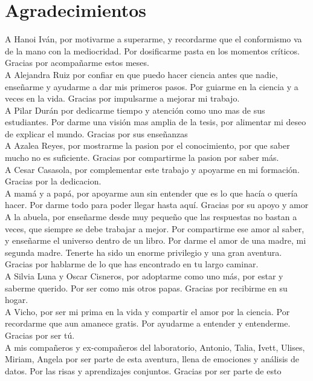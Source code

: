 \documentclass[12pt,letterpaper,final]{article}
\renewenvironment{acknowledgements}
{\newpage\section*{Agradecimientos}\begin{singlespace}\normalsize}
	{\end{singlespace}\par\newpage}
\begin{document}
\begin{acknowledgements}
A Hanoi Iván, por motivarme a superarme, y recordarme que el conformismo va de la mano con la mediocridad. Por dosificarme pasta en los momentos críticos. Gracias por acompañarme estos meses.\\

A Alejandra Ruiz por confiar en que puedo hacer ciencia antes que nadie, enseñarme y ayudarme a dar mis primeros pasos. Por guiarme en la ciencia y a veces en la vida. Gracias por impulsarme a mejorar mi trabajo.\\

A Pilar Durán por dedicarme tiempo y atención como uno mas de sus estudiantes. Por darme una visión mas amplia de la tesis, por alimentar mi deseo de explicar el mundo. Gracias por sus enseñanzas\\

A Azalea Reyes, por mostrarme la pasion por el conocimiento, por que saber mucho no es suficiente. Gracias por compartirme la pasion por saber más. \\

A Cesar Casasola, por complementar este trabajo y apoyarme en mi formación. Gracias por la dedicacion.\\

A mamá y a papá, por apoyarme aun sin entender que es lo que hacía o quería hacer. Por darme todo para poder llegar hasta aquí. Gracias por su apoyo y amor\\

A la abuela, por enseñarme desde muy pequeño que las respuestas no bastan a veces, que siempre se debe trabajar a mejor. Por compartirme ese amor al saber, y enseñarme el universo dentro de un libro. Por darme el amor de una madre, mi segunda madre. Tenerte ha sido un enorme privilegio y una gran aventura.  Gracias por hablarme de lo que has encontrado en tu largo caminar.\\

A Silvia Luna y Oscar Cisneros, por adoptarme como uno más, por estar y saberme querido. Por ser como mis otros papas. Gracias por recibirme en su hogar.\\

A Vicho, por ser mi prima en la vida y compartir el amor por la ciencia. Por recordarme que aun amanece gratis.
Por ayudarme a entender y entenderme. Gracias por ser tú. \\

A mis compañeros y ex-compañeros del laboratorio, Antonio, Talia, Ivett, Ulises, Miriam, Angela por ser parte de esta aventura, llena de emociones y análisis de datos. Por las risas y aprendizajes conjuntos.  Gracias por ser parte de esto\\


\end{acknowledgements}
\end{document}
